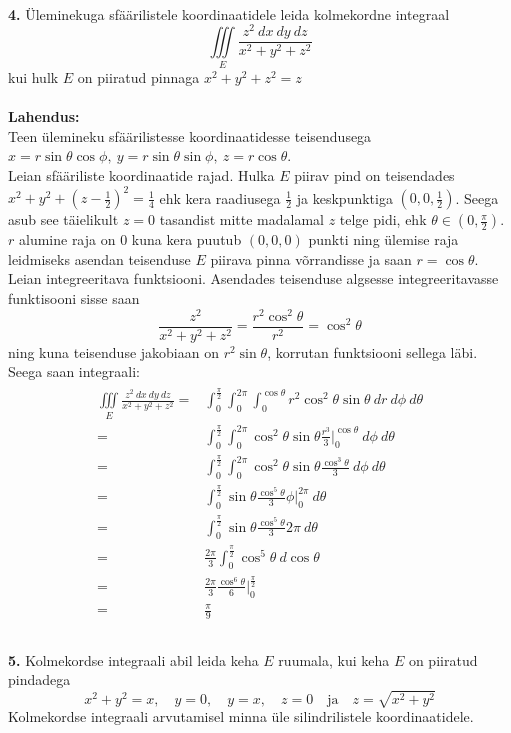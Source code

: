 \documentclass{article}
\begin{document}
\pagebreak\\
\textbf{4. }Üleminekuga sfäärilistele koordinaatidele leida kolmekordne integraal $$\iiint\limits_E\frac{z^2\ dx\ dy\ dz}{x^2+y^2+z^2}$$ kui hulk $E$ on piiratud pinnaga $x^2+y^2+z^2=z$\\\\
\textbf{Lahendus:}\\
Teen ülemineku sfäärilistesse koordinaatidesse teisendusega $x=r\sin\theta\cos\phi,\ y=r\sin\theta\sin\phi,\ z=r\cos\theta$.\\
Leian sfääriliste koordinaatide rajad. Hulka $E$ piirav pind on teisendades $x^2+y^2+\left(z-\frac12\right)^2=\frac14$ ehk kera raadiusega $\frac12$ ja keskpunktiga $\left(0,0,\frac12\right)$. Seega asub see täielikult $z=0$ tasandist mitte madalamal $z$ telge pidi, ehk $\theta\in\left(0,\frac{\pi}2\right)$. $r$ alumine raja on 0 kuna kera puutub $(0,0,0)$ punkti ning ülemise raja leidmiseks asendan teisenduse $E$ piirava pinna võrrandisse ja saan $r=\cos\theta$.\\
Leian integreeritava funktsiooni. Asendades teisenduse algsesse integreeritavasse funktisooni sisse saan $$\frac{z^2}{x^2+y^2+z^2}=\frac{r^2\cos^2\theta}{r^2}=\cos^2\theta$$ ning kuna teisenduse jakobiaan on $r^2\sin\theta$, korrutan funktsiooni sellega läbi. Seega saan integraali:
\begin{gather*}
\begin{aligned}
\iiint\limits_E\frac{z^2\ dx\ dy\ dz}{x^2+y^2+z^2}=&\int_0^\frac{\pi}2\int_0^{2\pi}\int_0^{\cos\theta}r^2\cos^2\theta\sin\theta\ dr\ d\phi\ d\theta\\
=&\int_0^\frac{\pi}2\int_0^{2\pi}\cos^2\theta\sin\theta\frac{r^3}{3}\bigg|_0^{\cos\theta}\ d\phi\ d\theta\\
=&\int_0^\frac{\pi}2\int_0^{2\pi}\cos^2\theta\sin\theta\frac{\cos^3\theta}{3}\ d\phi\ d\theta\\
=&\int_0^\frac{\pi}2\sin\theta\frac{\cos^5\theta}{3}\phi\big|_0^{2\pi}\ d\theta\\
=&\int_0^\frac{\pi}2\sin\theta\frac{\cos^5\theta}{3}2\pi\ d\theta\\
=&\frac{2\pi}3\int_0^\frac{\pi}2\cos^5\theta\ d\cos\theta\\
=&\frac{2\pi}3\frac{\cos^6\theta}6\bigg|_0^\frac{\pi}2\\
=&\frac{\pi}9\\
\end{aligned}
\end{gather*}
\pagebreak\\
\textbf{5.} Kolmekordse integraali abil leida keha $E$ ruumala, kui keha $E$ on piiratud pindadega $$x^2+y^2=x,\quad y=0,\quad y=x,\quad z=0\quad\text{ja}\quad z=\sqrt{x^2+y^2} $$Kolmekordse integraali arvutamisel minna üle silindrilistele koordinaatidele.\\\\
\end{document}
